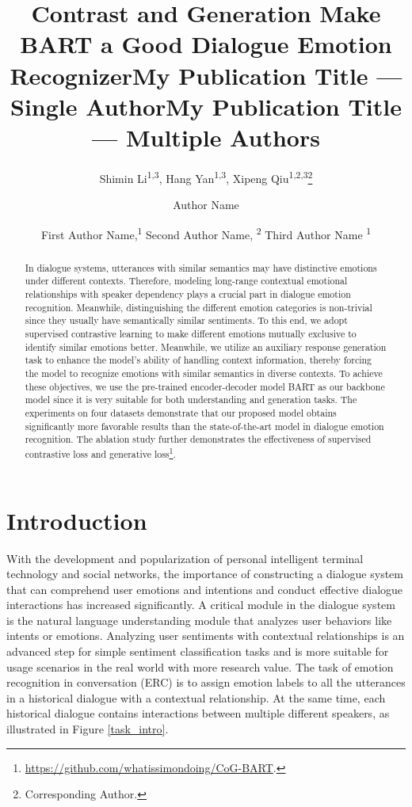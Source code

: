 \documentclass[letterpaper]{article} \usepackage{aaai22}  \usepackage{times}  \usepackage{helvet}  \usepackage{courier}  \usepackage[hyphens]{url}  \usepackage{graphicx} \urlstyle{rm} \def\UrlFont{\rm}  \usepackage{natbib}  \usepackage{caption} \DeclareCaptionStyle{ruled}{labelfont=normalfont,labelsep=colon,strut=off} \frenchspacing  \setlength{\pdfpagewidth}{8.5in}  \setlength{\pdfpageheight}{11in}  \usepackage{algorithm}
\title{Contrast and Generation Make BART a Good Dialogue Emotion Recognizer}
\author{
Shimin Li\textsuperscript{\rm 1,3},
    Hang Yan\textsuperscript{\rm 1,3},
    Xipeng Qiu\textsuperscript{\rm 1,2,3}\thanks{Corresponding Author.}
}
\title{My Publication Title --- Single Author}
\author {
    Author Name
}
\title{My Publication Title --- Multiple Authors}
\author {
First Author Name,\textsuperscript{\rm 1}
    Second Author Name, \textsuperscript{\rm 2}
    Third Author Name \textsuperscript{\rm 1}
}
\begin{document}
\maketitle

\begin{abstract}
In dialogue systems, utterances with similar semantics may have distinctive emotions under different contexts. Therefore, modeling long-range contextual emotional relationships with speaker dependency plays a crucial part in dialogue emotion recognition. Meanwhile, distinguishing the different emotion categories is non-trivial since they usually have semantically similar sentiments. To this end, we adopt supervised contrastive learning to make different emotions mutually exclusive to identify similar emotions better. Meanwhile, we utilize an auxiliary response generation task to enhance the model's ability of handling context information, thereby forcing the model to recognize emotions with similar semantics in diverse contexts. To achieve these objectives, we use the pre-trained encoder-decoder model BART as our backbone model since it is very suitable for both understanding and generation tasks. The experiments on four datasets demonstrate that our proposed model obtains significantly more favorable results than the state-of-the-art model in dialogue emotion recognition. The ablation study further demonstrates the effectiveness of supervised contrastive loss and generative loss\footnote{\url{https://github.com/whatissimondoing/CoG-BART}.}.

\end{abstract}

\section{Introduction}
With the development and popularization of personal intelligent terminal technology and social networks, the importance of constructing a dialogue system that can comprehend user emotions and intentions and conduct effective dialogue interactions has increased significantly. A critical module in the dialogue system is the natural language understanding module that analyzes user behaviors like intents or emotions. Analyzing user sentiments with contextual relationships is an advanced step for simple sentiment classification tasks and is more suitable for usage scenarios in the real world with more research value. The task of emotion recognition in conversation (ERC) is to assign emotion labels to all the utterances in a historical dialogue with a contextual relationship. At the same time, each historical dialogue contains interactions between multiple different speakers, as illustrated in Figure \ref{task_intro}.
\end{document}
